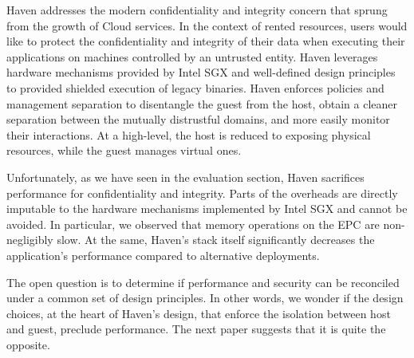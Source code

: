 %
Haven addresses the modern confidentiality and integrity concern that sprung from the growth of Cloud services.
In the context of rented resources, users would like to protect the confidentiality and integrity of their data when executing their applications on machines controlled by an untrusted entity.
Haven leverages hardware mechanisms provided by Intel SGX and well-defined design principles to provided shielded execution of legacy binaries.
Haven enforces policies and management separation to disentangle the guest from the host, obtain a cleaner separation between the mutually distrustful domains, and more easily monitor their interactions.
At a high-level, the host is reduced to exposing physical resources, while the guest manages virtual ones.

Unfortunately, as we have seen in the evaluation section, Haven sacrifices performance for confidentiality and integrity.
Parts of the overheads are directly imputable to the hardware mechanisms implemented by Intel SGX and cannot be avoided.
In particular, we observed that memory operations on the EPC are non-negligibly slow.
At the same, Haven's stack itself significantly decreases the application's performance compared to alternative deployments.

The open question is to determine if performance and security can be reconciled under a common set of design principles.
In other words, we wonder if the design choices, at the heart of Haven's design, that enforce the isolation between host and guest, preclude performance.
The next paper suggests that it is quite the opposite.